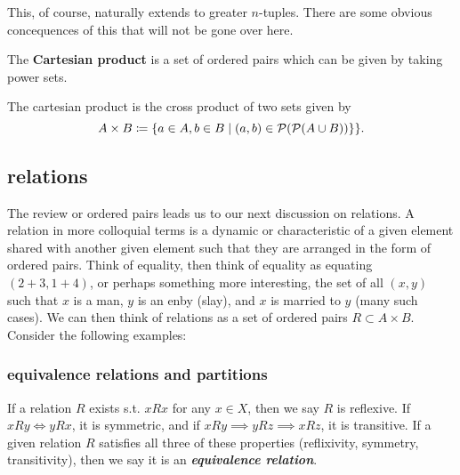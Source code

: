 \documentclass[12pt,oneside]{report}
\begin{document}
This, of course, naturally extends to greater \( n \)-tuples. There are some obvious concequences of this that will not be gone over here. 

The \textbf{Cartesian product} is a set of ordered pairs which can be given by taking power sets. 

\begin{definition}
  The cartesian product is the cross product of two sets given by 
\[ A \times  B \coloneqq  \{a \in A, b \in B \mid  (a,b) \in  \mathcal{P}(\mathcal{P}(A \cup B))  \}  \}   .\]
\end{definition}

\subsection{relations}

The review or ordered pairs leads us to our next discussion on relations. A relation in more colloquial terms is a dynamic or characteristic of a given element shared with another given element such that they are arranged in the form of ordered pairs. Think of equality, then think of equality as equating \( (2+3,1+4) \), or perhaps something more interesting, the set of all \( (x,y) \) such that \( x \) is a man, \( y \) is an enby (slay), and \( x \) is married to \( y \) (many such cases). We can then think of relations as a set of ordered pairs \( R \subset A\times B \). Consider the following examples:

\subsubsection{equivalence relations and partitions}

If a relation \( R \) exists s.t. \( xRx \) for any \( x \in  X \), then we say \( R \) is reflexive. If \( xRy \iff yRx \), it is symmetric, and if \( xRy \implies yRz \implies xRz \), it is transitive. If a given relation \( R \) satisfies all three of these properties (reflixivity, symmetry, transitivity), then we say it is an \textbf{\textit{equivalence relation}}. 
\end{document}
